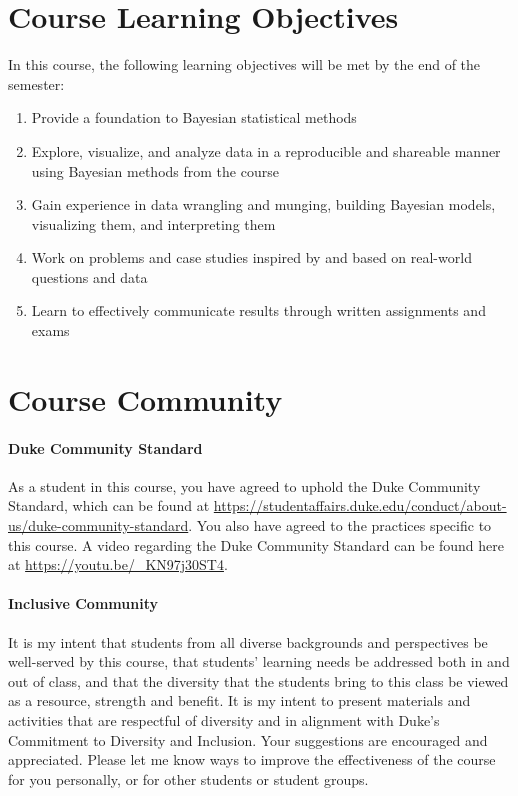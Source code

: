 \documentclass[11pt]{article}
\begin{document}
\section{Course Learning Objectives}
In this course, the following learning objectives will be met by the end of the semester:
\begin{enumerate}
\item Provide a foundation to Bayesian statistical methods
\item Explore, visualize, and analyze data in a reproducible and shareable manner using Bayesian methods from the course
\item Gain experience in data wrangling and munging, building Bayesian models, visualizing them, and interpreting them 
\item Work on problems and case studies inspired by and based on real-world questions and data
\item Learn to effectively communicate results through written assignments and exams 
\end{enumerate}

\section{Course Community}



\paragraph{Duke Community Standard} 
As a student in this course, you have agreed to uphold the Duke Community Standard, which can be found at \url{https://studentaffairs.duke.edu/conduct/about-us/duke-community-standard}. You also have agreed to the practices specific to this course.  A video regarding the Duke Community Standard can be found here at \url{https://youtu.be/_KN97j30ST4}. 


\paragraph{Inclusive Community}

It is my intent that students from all diverse backgrounds and perspectives be well-served by this course, that students’ learning needs be addressed both in and out of class, and that the diversity that the students bring to this class be viewed as a resource, strength and benefit. It is my intent to present materials and activities that are respectful of diversity and in alignment with Duke’s Commitment to Diversity and Inclusion. Your suggestions are encouraged and appreciated. Please let me know ways to improve the effectiveness of the course for you personally, or for other students or student groups. \\
\end{document}
